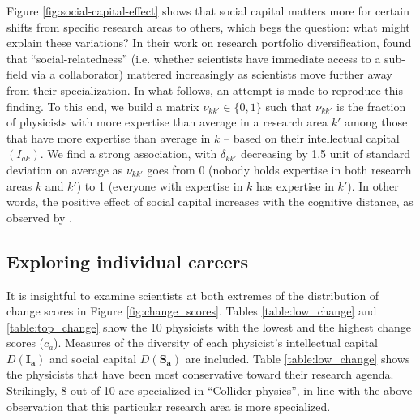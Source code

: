 \documentclass{article}
\begin{document}
Figure \ref{fig:social-capital-effect} shows that social capital matters more for certain shifts from specific research areas to others, which begs the question: what might explain these variations? In their work on research portfolio diversification, \citet{Tripodi2020} found that ``social-relatedness'' (i.e. whether scientists have immediate access to a sub-field via a collaborator) mattered increasingly as scientists move further away from their specialization. In what follows, an attempt is made to reproduce this finding. To this end, we build a matrix $\nu_{kk'}\in\{0,1\}$ such that $\nu_{kk'}$ is the fraction of physicists with more expertise than average in a research area $k'$ among those that have more expertise than average in $k$ -- based on their intellectual capital $(I_{ak})$. We find a strong association, with $\delta_{kk'}$ decreasing by 1.5 unit of standard deviation on average as $\nu_{kk'}$ goes from 0 (nobody holds expertise in both research areas $k$ and $k'$) to 1 (everyone with expertise in $k$ has expertise in $k'$). In other words, the positive effect of social capital increases with the cognitive distance, as observed by \citet{Tripodi2020}.



\subsection{\label{sec:cases}Exploring individual careers}

It is insightful to examine scientists at both extremes of the distribution of change scores in Figure \ref{fig:change_scores}. Tables \ref{table:low_change} and \ref{table:top_change} show the 10 physicists with the lowest and the highest change scores ($c_a$). Measures of the diversity of each physicist's intellectual capital $D(\bm{I_a})$ and social capital $D(\bm{S_a})$ are included. Table \ref{table:low_change} shows the physicists that have been most conservative toward their research agenda. Strikingly, 8 out of 10 are specialized in ``Collider physics'', in line with the above observation that this particular research area is more specialized.
\end{document}
